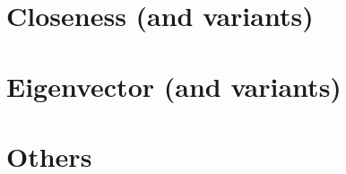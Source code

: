 \documentclass[]{book}
\theoremstyle{definition}
\theoremstyle{definition}
\theoremstyle{definition}
\theoremstyle{remark}
\begin{document}
\hypertarget{closeness-and-variants}{%
\section{Closeness (and variants)}\label{closeness-and-variants}}

\hypertarget{eigenvector-and-variants}{%
\section{Eigenvector (and variants)}\label{eigenvector-and-variants}}

\hypertarget{others}{%
\section{Others}\label{others}}


\end{document}
